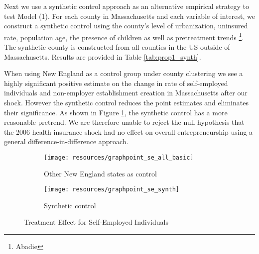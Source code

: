\documentclass[12pt]{article}
\begin{document}
\begin{center}
	\begin{table}[H]
		\centering
		\caption{Model (1) estimator with other New England states as control} 
			
		\label{tab:prop1}
	\end{table}		
\end{center}

\begin{center}
	\begin{table}[H]
		\centering
		\caption{Model (1) estimator with other New England states as control} 
			
		\label{tab:prop1_state}
	\end{table}		
\end{center}

Next we use a synthetic control approach as an alternative empirical strategy to test Model (1). For each county in Massachusetts and each variable of interest, we construct a synthetic control using the county's level of urbanization, uninsured rate, population age, the presence of children as well as pretreatment trends \footnote{Abadie}. The synthetic county is constructed from all counties in the US outside of Massachusetts. Results are provided in Table \ref{tab:prop1_synth}.

\begin{center}
	\begin{table}[H]
		\centering
		\caption{Model (1) estimator with synthetic control} 
			
		\label{tab:prop1_synth}
	\end{table}		
\end{center}

When using New England as a control group under county clustering we see a highly significant positive estimate on the change in rate of self-employed individuals and non-employer establishment creation in Massachusetts after our shock. However the synthetic control reduces the point estimates and eliminates their significance. As shown in Figure \ref{fig:state_contrast}, the synthetic control has a more reasonable pretrend. We are therefore unable to reject the null hypothesis that the 2006 health insurance shock had no effect on overall entrepreneurship using a general difference-in-difference approach.

\begin{figure}[H]
	\centering
	\begin{subfigure}[b]{0.495\textwidth}
		\texttt{[image: resources/graphpoint\_se\_all\_basic]}
		\caption{Other New England states as control}
	\end{subfigure}
		\begin{subfigure}[b]{0.495\textwidth}
		\texttt{[image: resources/graphpoint\_se\_synth]}
		\caption{Synthetic control}
	\end{subfigure}
	\caption{Treatment Effect for Self-Employed Individuals}
	\label{fig:state_contrast}
\end{figure}
\end{document}
